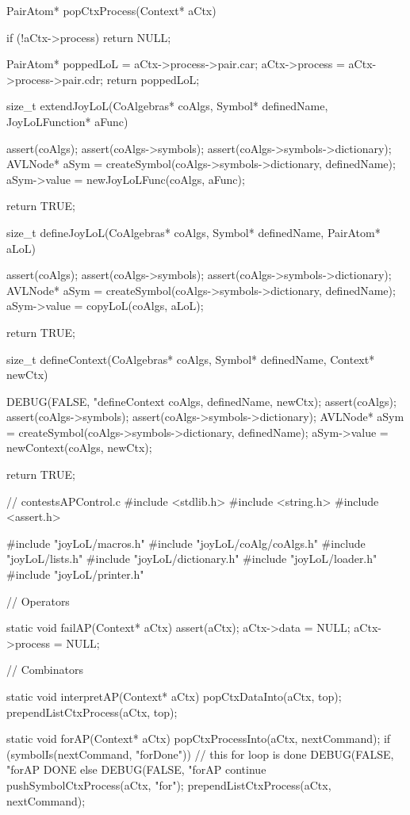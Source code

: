PairAtom* popCtxProcess(Context* aCtx) {
  if (!aCtx->process) return NULL;

  PairAtom* poppedLoL = aCtx->process->pair.car;
  aCtx->process       = aCtx->process->pair.cdr;
  return poppedLoL;
}

size_t extendJoyLoL(CoAlgebras* coAlgs,
                    Symbol* definedName,
                    JoyLoLFunction* aFunc) {
  assert(coAlgs);
  assert(coAlgs->symbols);
  assert(coAlgs->symbols->dictionary);
  AVLNode* aSym =
    createSymbol(coAlgs->symbols->dictionary, definedName);
  aSym->value = newJoyLoLFunc(coAlgs, aFunc);

  return TRUE;
}

size_t defineJoyLoL(CoAlgebras* coAlgs,
                    Symbol* definedName,
                    PairAtom* aLoL) {
  assert(coAlgs);
  assert(coAlgs->symbols);
  assert(coAlgs->symbols->dictionary);
  AVLNode* aSym =
    createSymbol(coAlgs->symbols->dictionary, definedName);
  aSym->value = copyLoL(coAlgs, aLoL);

  return TRUE;
}

size_t defineContext(CoAlgebras* coAlgs,
                     Symbol* definedName,
                     Context* newCtx) {
  DEBUG(FALSE, "defineContext %
        coAlgs, definedName, newCtx);
  assert(coAlgs);
  assert(coAlgs->symbols);
  assert(coAlgs->symbols->dictionary);
  AVLNode* aSym =
    createSymbol(coAlgs->symbols->dictionary, definedName);
  aSym->value   = newContext(coAlgs, newCtx);

  return TRUE;
}
\stoptyping

\starttyping
// contestsAPControl.c
#include <stdlib.h>
#include <string.h>
#include <assert.h>


#include "joyLoL/macros.h"
#include "joyLoL/coAlg/coAlgs.h"
#include "joyLoL/lists.h"
#include "joyLoL/dictionary.h"
#include "joyLoL/loader.h"
#include "joyLoL/printer.h"

// Operators

static void failAP(Context* aCtx) {
  assert(aCtx);
  aCtx->data    = NULL;
  aCtx->process = NULL;
}

// Combinators

static void interpretAP(Context* aCtx) {
  popCtxDataInto(aCtx, top);
  prependListCtxProcess(aCtx, top);
}

static void forAP(Context* aCtx) {
  popCtxProcessInto(aCtx, nextCommand);
  if (symbolIs(nextCommand, "forDone")) {
    // this for loop is done
    DEBUG(FALSE, "forAP DONE%
  } else {
    DEBUG(FALSE, "forAP continue%
    pushSymbolCtxProcess(aCtx, "for");
    prependListCtxProcess(aCtx, nextCommand);
  }
}

